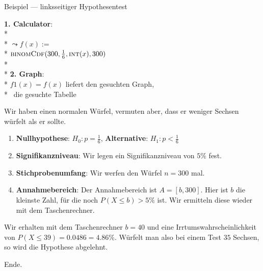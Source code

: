 \begin{bla}{Beispiel --- linksseitiger Hypothesentest}
  \begin{marginfigure}
    \begin{tcolorbox}[colback=white!95!black,colframe=white!75!black,title=CAS:,arc=0mm]
      \begin{scriptsize}
        \textbf{1. Calculator}: \\*
         \\*
        \( \leadsto f(x) := \) \\* \hfill \( \text{\textsc{binomCdf}}(300, \tfrac{1}{6}, \text{\textsc{int}}(x), 300) \) \\*
        \ \\*
        \textbf{2. Graph}: \\*
        \( f1(x) = f(x) \) liefert den gesuchten Graph, \\*
         \ die gesuchte Tabelle
      \end{scriptsize}
    \end{tcolorbox}
  \end{marginfigure}
  Wir haben einen normalen Würfel, vermuten aber, dass er weniger Sechsen würfelt als er sollte.
  \begin{enumerate}
    \item \textbf{Nullhypothese}: $H_0: p=\tfrac{1}{6}$, \textbf{Alternative}: $H_1: p<\tfrac{1}{6}$
    \item \textbf{Signifikanzniveau}: Wir legen ein Signifikanzniveau von $5\%$ fest.
    \item \textbf{Stichprobenumfang}: Wir werfen den Würfel $n=300$ mal.
    \item \textbf{Annahmebereich}: Der Annahmebereich ist $A=[b,300]$. Hier ist $b$ die kleinste Zahl, für die noch $P(X \leq b) > 5\%$ ist. Wir ermitteln diese wieder mit dem Taschenrechner.
  \end{enumerate}
  Wir erhalten mit dem Taschenrechner $b=40$ und eine Irrtumswahrscheinlichkeit von $P(X \leq 39)=0.0486=4.86\%$. Würfelt man also bei einem Test $35$ Sechsen, so wird die Hypothese abgelehnt.
\end{bla}

Ende.

\clearpage
\thispagestyle{empty}
\hfill
\clearpage
\thispagestyle{empty}
\hfill
\clearpage
\thispagestyle{empty}
\hfill
\clearpage
\thispagestyle{empty}
\hfill
\clearpage
\thispagestyle{empty}
\hfill
\clearpage
\thispagestyle{empty}
\hfill
\clearpage
\thispagestyle{empty}
\hfill
\clearpage
\thispagestyle{empty}
\hfill
\clearpage
\thispagestyle{empty}
\hfill
\clearpage
\thispagestyle{empty}
\hfill
\clearpage
